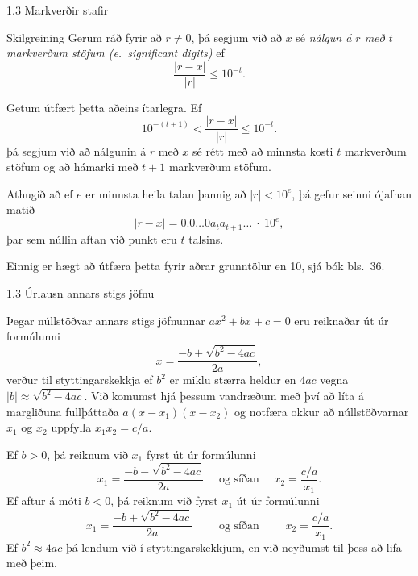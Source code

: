 \begin{frame}{1.3 Markverðir stafir}
 \begin{block}{Skilgreining}
  Gerum ráð fyrir að $r\neq 0$, þá segjum við að $x$ sé 
  \emph{nálgun á $r$ með $t$ markverðum stöfum 
  \emph{(e.~significant digits)}} ef 
  $$
    \frac{|r-x|}{|r|} \leq 10^{-t}.
  $$
  \pause
  
  Getum útfært þetta aðeins ítarlegra. Ef
  $$
  10^{-(t+1)} < \frac{|r-x|}{|r|} \leq 10^{-t}.
  $$
  þá segjum við að nálgunin á $r$ með $x$ sé rétt með að minnsta kosti
  $t$ markverðum stöfum og að hámarki með $t+1$ markverðum stöfum.
  
  \pause
  
   Athugið að ef $e$ er minnsta heila talan þannig að $|r|<10^e$, 
þá gefur seinni ójafnan matið 
\begin{equation*}
    |r-x| = 0.0\dots 0 a_t a_{t+1}\ldots \ \cdot\  10^e,
\end{equation*}
þar sem núllin aftan við punkt eru $t$ talsins.  
  
  Einnig er hægt að útfæra þetta fyrir aðrar grunntölur en 10, sjá 
  bók bls.~36.
 \end{block}

\end{frame}


\begin{frame}{1.3 Úrlausn annars stigs jöfnu} 

Þegar núllstöðvar annars stigs jöfnunnar $ax^2+bx+c=0$  eru reiknaðar
út úr formúlunni  
\begin{equation*}
    x = \dfrac{-b\pm\sqrt{b^2-4ac}}{2a},
\end{equation*}
verður til styttingarskekkja ef $b^2$ er miklu stærra heldur en $4ac$
vegna $|b|\approx\sqrt{b^2-4ac}$. \pause Við komumst hjá þessum vandræðum með
því að líta á margliðuna fullþáttaða $a(x-x_1)(x-x_2)$ og notfæra
okkur að núllstöðvarnar  $x_1$ og $x_2$ uppfylla
$x_1x_2=c/a$. 

\pause
\smallskip
Ef $b>0$, þá reiknum við $x_1$ fyrst út úr formúlunni
\begin{equation*}
    x_1 = \dfrac{-b-\sqrt{b^2-4ac}}{2a}
    \quad \text{ og  síðan } \quad
    x_2 = \dfrac{c/a}{x_1}.
\end{equation*}\pause
Ef aftur á móti $b<0$, þá reiknum við fyrst $x_1$ út úr  formúlunni
\begin{equation*}
    x_1 = \dfrac{-b+\sqrt{b^2-4ac}}{2a} 
    \qquad \text{ og síðan } \qquad 
    x_2 = \dfrac{c/a}{x_1}.
\end{equation*}\pause
Ef $b^2\approx 4ac$ þá lendum við í styttingarskekkjum, en við
neyðumst til þess að lifa með þeim. 
\end{frame}

